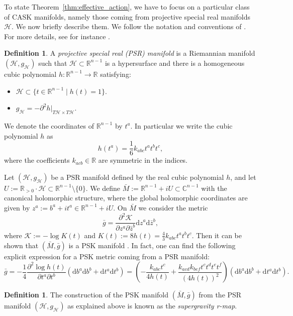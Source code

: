 \documentclass{article}
\theoremstyle{definition}
\newtheorem{definition}[theorem]{Definition}
\newcommand{\R}{\mathbb{R}}
\newcommand{\C}{\mathbb{C}}
\newcommand{\calH}{\mathcal{H}}
\newcommand{\calK}{\mathcal{K}}
\renewcommand{\d}{\mathrm{d}}
\begin{document}
    To state Theorem~\ref{thm:effective_action}, we have to focus on a particular class of CASK manifolds, namely those coming from projective special real manifolds $\calH$. We now briefly describe them. We follow the notation and conventions of \cite{CT22}. For more details, see for instance \cite{CHM12,CDJL21}.
    
    \begin{definition}
		A \emph{projective special real (PSR) manifold} is a Riemannian manifold $(\calH,g_{\calH})$ such that $\calH\subset\R^{n-1}$ is a hypersurface and there is a homogeneous cubic polynomial $h:\R^{n-1}\longrightarrow\R$ satisfying: \begin{itemize}
			\itemsep 0em
			\item $\calH\subset\{t\in\R^{n-1}\mid h(t)=1\}$.
			\item $g_\calH=-\partial^2h|_{T\calH\times T\calH}$.
		\end{itemize}
    \end{definition}
    
    We denote the coordinates of $\R^{n-1}$ by $t^a$. In particular we write the cubic polynomial $h$ as $$h(t^a)=\frac{1}{6}k_{abc}t^at^bt^c,$$ where the coefficients $k_{acb}\in\R$ are symmetric in the indices.\medskip
 
    Let $(\calH,g_\calH)$ be a PSR manifold defined by the real cubic polynomial $h$, and let $U:=\R_{>0}\cdot\calH\subset\R^{n-1}\setminus\{0\}$. We define $\bar{M}:=\R^{n-1}+iU\subset\C^{n-1}$ with the canonical holomorphic structure, where the global holomorphic coordinates are given by $z^a:=b^a+it^a\in\R^{n-1}+iU$. On $\bar{M}$ we consider the metric $$\bar{g}=\frac{\partial^2\calK}{\partial z^a\partial\bar{z}^b}\d z^a\d\bar{z}^b,$$ where $\calK:=-\log K(t)$ and $K(t):=8h(t)=\frac{4}{3}k_{abc}t^at^bt^c$. Then it can be shown that $(\bar{M},\bar{g})$ is a PSK manifold \cite{CHM12}. In fact, one can find the following explicit expression for a PSK metric coming from a PSR manifold: $$\bar g=-\frac{1}{4}\frac{\partial^2\log h(t)}{\partial t^a\partial t^b}(\d b^a\d b^b+\d t^a\d t^b)=\left(-\frac{k_{abc}t^c}{4h(t)}+\frac{k_{acd}k_{bef}t^ct^dt^et^f}{(4h(t))^2}\right)(\d b^a\d b^b+\d t^a\d t^b).$$

    \begin{definition}
        The construction of the PSK manifold $(\bar M,\bar g)$ from the PSR manifold $(\calH,g_\calH)$ as explained above is known as the \emph{supergravity r-map}.
    \end{definition}
    
\end{document}
